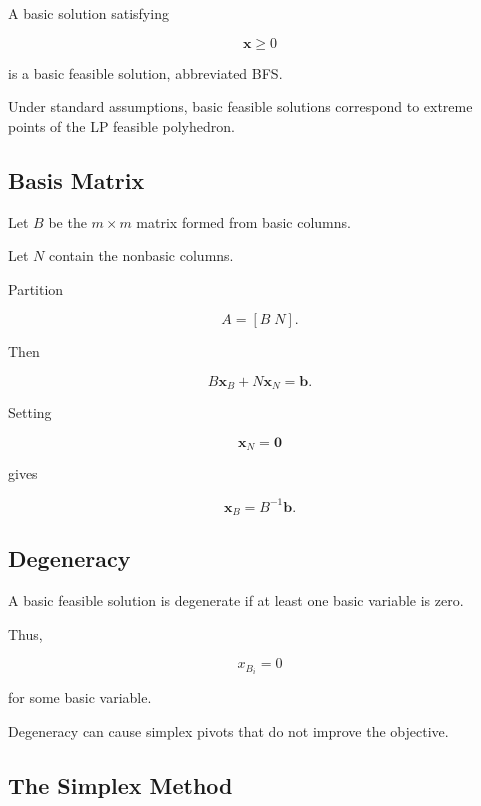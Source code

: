A basic solution satisfying

\[
\boxed{
\mathbf{x}\geq0
}
\]

is a basic feasible solution, abbreviated BFS.

Under standard assumptions, basic feasible solutions correspond to
extreme points of the LP feasible polyhedron.

\subsection{Basis Matrix}
\label{subsec:lp-basis-matrix}

Let \(B\) be the \(m\times m\) matrix formed from basic columns.

Let \(N\) contain the nonbasic columns.

Partition

\[
A
=
[B\;N].
\]

Then

\[
B\mathbf{x}_B
+
N\mathbf{x}_N
=
\mathbf{b}.
\]

Setting

\[
\mathbf{x}_N=\mathbf{0}
\]

gives

\[
\boxed{
\mathbf{x}_B
=
B^{-1}\mathbf{b}.
}
\]

\subsection{Degeneracy}
\label{subsec:lp-degeneracy}

A basic feasible solution is degenerate if at least one basic variable is
zero.

Thus,

\[
\boxed{
x_{B_i}=0
}
\]

for some basic variable.

Degeneracy can cause simplex pivots that do not improve the objective.

\subsection{The Simplex Method}
\label{subsec:simplex-method}

